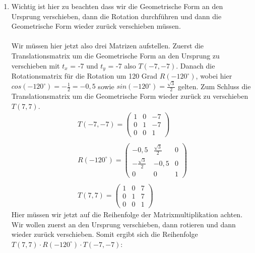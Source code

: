 \documentclass[11pt]{article}
\begin{document}
\begin{enumerate}
\begin{align*}
\begin{pmatrix*}
                   0 & 1 & 0 \\
                   0 & 0 & 1
                 \end{pmatrix*}
        \end{align*}
  \item Wichtig ist hier zu beachten dass wir die Geometrische Form an den Ursprung verschieben, dann die Rotation durchführen und dann die Geometrische Form wieder zurück verschieben müssen.\\ \\
        Wir müssen hier jetzt also drei Matrizen aufstellen. Zuerst die Translationsmatrix um die Geometrische Form an den Ursprung zu verschieben mit $t_x$ = -7 und $t_y$ = -7 also $T(-7, -7)$. Danach die Rotationsmatrix für die Rotation um 120 Grad $R(-120^\circ)$, wobei hier $cos(-120^\circ) = -\frac{1}{2} = -0,5$ sowie $sin(-120^\circ) = \frac{\sqrt{3}}{2}$ gelten. Zum Schluss die Translationsmatrix um die Geometrische Form wieder zurück zu verschieben $T(7, 7)$.\\
        \begin{align*}
          T(-7, -7) = \begin{pmatrix*}
                        1 & 0 & -7 \\
                        0 & 1 & -7 \\
                        0 & 0 & 1
                      \end{pmatrix*}                  \\ \\
          R(-120^\circ) =
          \begin{pmatrix*}
            -0,5 & \frac{\sqrt{3}}{2} & 0 \\
            -\frac{\sqrt{3}}{2} & -0,5 & 0 \\
            0 & 0 & 1
          \end{pmatrix*} \\ \\
          T(7, 7) = \begin{pmatrix*}
                      1 & 0 & 7 \\
                      0 & 1 & 7 \\
                      0 & 0 & 1
                    \end{pmatrix*}
        \end{align*}
        Hier müssen wir jetzt auf die Reihenfolge der Matrixmultiplikation achten. Wir wollen zuerst an den Ursprung verschieben, dann rotieren und dann wieder zurück verschieben. Somit ergibt sich die Reihenfolge $T(7, 7) \cdot R(-120^\circ) \cdot T(-7, -7)$:

\end{enumerate}
\end{document}
